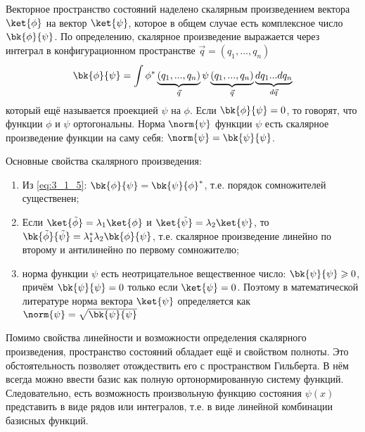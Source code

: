 Векторное пространство состояний наделено скалярным произведением вектора $\ket{\phi}$ на вектор $\ket{\psi}$, которое в общем случае есть комплексное число $\bk{\phi}{\psi}$. По определению, скалярное произведение выражается через интеграл в конфигурационном пространстве $\vec{q} = (q_1, ..., q_n)$%
%
\begin{equation}
\label{eq:3_1_5}
\bk{\phi}{\psi} = \int \phi^*\underbrace{(q_1, ..., q_n)}_{\vec{q}} \psi\underbrace{(q_1, ..., q_n)}_{\vec{q}} \underbrace{d q_1 ... d q_n}_{d\vec{q}}
\end{equation}%
%
который ещё называется проекцией $\psi$ на $\phi$. Если $\bk{\phi}{\psi} = 0$, то говорят, что функции $\phi$ и $\psi$ ортогональны. Норма $\norm{\psi}$ функции $\psi$ есть скалярное произведение функции на саму себя: $\norm{\psi} = \bk{\psi}{\psi}$.

Основные свойства скалярного произведения:%
%
\begin{enumerate}
  \item Из \eqref{eq:3_1_5}: $\bk{\phi}{\psi} = \bk{\psi}{\phi}^*$, т.е. порядок сомножителей существенен;
%
  \item Если $\ket{\tilde{\phi}} = \lambda_1\ket{\phi}$ и $\ket{\tilde{\psi}} = \lambda_2\ket{\psi}$, то $\bk{\tilde{\phi}}{\tilde{\psi}} = \lambda_1^* \lambda_2 \bk{\phi}{\psi}$, т.е. скалярное произведение линейно по второму и антилинейно по первому сомножителю;
%
  \item норма функции $\psi$ есть неотрицательное вещественное число: $\bk{\psi}{\psi} \geqslant 0$, причём $\bk{\psi}{\psi} = 0$ только если $\ket{\psi} = 0$. Поэтому в математической литературе норма вектора $\ket{\psi}$ определяется как $\norm{\psi} = \sqrt{\bk{\psi}{\psi}}$
\end{enumerate}

Помимо свойства линейности и возможности определения скалярного произведения, пространство состояний обладает ещё и свойством полноты. Это обстоятельность позволяет отождествить его с пространством Гильберта. В нём всегда можно ввести базис как полную ортонормированную систему функций. Следовательно, есть возможность произвольную функцию состояния $\psi(x)$ представить в виде рядов или интегралов, т.е. в виде линейной комбинации базисных функций.

